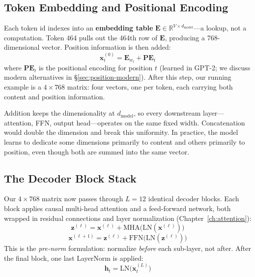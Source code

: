 \subsection{Token Embedding and Positional Encoding}

Each token id indexes into an \textbf{embedding table} $\mathbf{E} \in \mathbb{R}^{V \times d_\text{model}}$---a lookup, not a computation. Token 464 pulls out the 464th row of $\mathbf{E}$, producing a 768-dimensional vector. Position information is then added:
\[
  \mathbf{x}_t^{(0)} = \mathbf{E}_{w_t} + \mathbf{PE}_t
\]
where $\mathbf{PE}_t$ is the positional encoding for position $t$ (learned in GPT-2; we discuss modern alternatives in \S\ref{sec:position-modern}). After this step, our running example is a $4 \times 768$ matrix: four vectors, one per token, each carrying both content and position information.

\medskip
\noindent{}
\medskip

Addition keeps the dimensionality at $d_{\text{model}}$, so every downstream layer---attention, FFN, output head---operates on the same fixed width. Concatenation would double the dimension and break this uniformity. In practice, the model learns to dedicate some dimensions primarily to content and others primarily to position, even though both are summed into the same vector.

\subsection{The Decoder Block Stack}

Our $4 \times 768$ matrix now passes through $L = 12$ identical decoder blocks. Each block applies causal multi-head attention and a feed-forward network, both wrapped in residual connections and layer normalization (Chapter~\ref{ch:attention}):
\[
  \mathbf{z}^{(\ell)} = \mathbf{x}^{(\ell)} + \text{MHA}\!\big(\text{LN}(\mathbf{x}^{(\ell)})\big)
\]
\[
  \mathbf{x}^{(\ell+1)} = \mathbf{z}^{(\ell)} + \text{FFN}\!\big(\text{LN}(\mathbf{z}^{(\ell)})\big)
\]
This is the \emph{pre-norm} formulation: normalize \emph{before} each sub-layer, not after. After the final block, one last LayerNorm is applied:
\[
  \mathbf{h}_t = \text{LN}\!\big(\mathbf{x}_t^{(L)}\big)
\]

